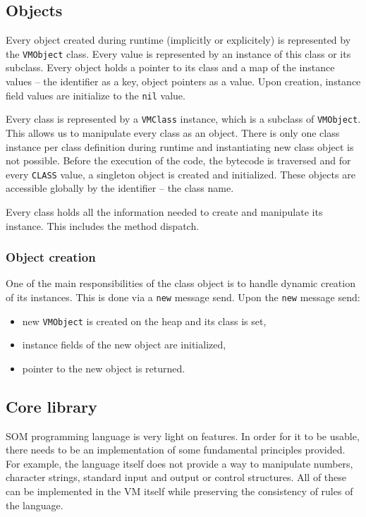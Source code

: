 \documentclass[thesis=M,english]{FITthesis}[2019/12/23]
\begin{document}
\subsection{Objects}
Every object created during runtime (implicitly or explicitely) is represented by the \texttt{VMObject} class. Every value is represented by an instance of this
class or its subclass. Every object holds a pointer to its class and a map of the instance values -- the identifier as a key, object pointers as a value. Upon creation,
instance field values are initialize to the \texttt{nil} value.

Every class is represented by a \texttt{VMClass} instance, which is a subclass of \texttt{VMObject}. This allows us to manipulate every class as an object. There
is only one class instance per class definition during runtime and instantiating new class object is not possible. Before the execution of the code, the bytecode
is traversed and for every \texttt{CLASS} value, a singleton object is created and initialized. These objects are accessible globally by the identifier -- the class name.

Every class holds all the information needed to create and manipulate its instance. This includes the method dispatch.

\subsubsection{Object creation}
One of the main responsibilities of the class object is to handle dynamic creation of its instances. This is done via a \texttt{new} message send.
Upon the \texttt{new} message send:
\begin{itemize}
	\item new \texttt{VMObject} is created on the heap and its class is set,
	\item instance fields of the new object are initialized,
	\item pointer to the new object is returned.
\end{itemize}

\subsection{Core library}
SOM programming language is very light on features. In order for it to be usable, there needs to be an implementation of some fundamental principles provided.
For example, the language itself does not provide a way to manipulate numbers, character strings, standard input and output or control structures. All of these
can be implemented in the VM itself while preserving the consistency of rules of the language.
\end{document}
